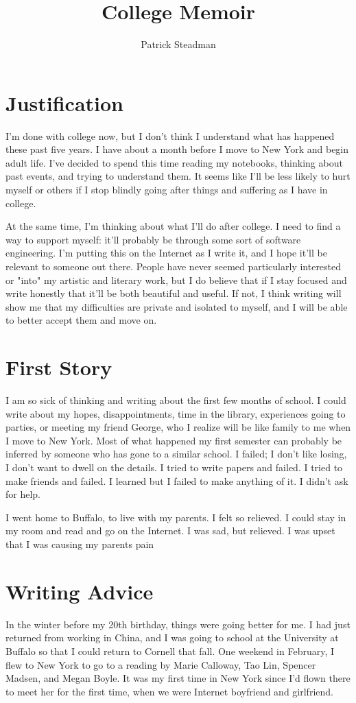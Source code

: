 \documentclass[12pt]{article}
\title{College Memoir}
\author{Patrick Steadman}
\begin{document}
\maketitle

\section{Justification}
I'm done with college now, but I don't think I understand what has happened
these past five years.  I have about a month before I move to New York and begin
adult life.  I've decided to spend this time reading my notebooks, thinking
about past events, and trying to understand them.  It seems like I'll be less
likely to hurt myself or others if I stop blindly going after things and
suffering as I have in college.

At the same time, I'm thinking about what I'll do after college.  I need to find
a way to support myself: it'll probably be through some sort of software
engineering.  I'm putting this on the Internet as I write it, and I hope it'll
be relevant to someone out there.  People have never seemed particularly
interested or "into" my artistic and literary work, but I do believe that if I
stay focused and write honestly that it'll be both beautiful and useful.  If
not, I think writing will show me that my difficulties are private and isolated
to myself, and I will be able to better accept them and move on.

\section{First Story}
I am so sick of thinking and writing about the first few months of school.  I
could write about my hopes, disappointments, time in the library, experiences
going to parties, or meeting my friend George, who I realize will be like family
to me when I move to New York.  Most of what happened my first semester can
probably be inferred by someone who has gone to a similar school.  I failed; I
don't like losing, I don't want to dwell on the details.  I tried to write
papers and failed.  I tried to make friends and failed.  I learned but I failed
to make anything of it.  I didn't ask for help.

I went home to Buffalo, to live with my parents.  I felt so relieved.  I could
stay in my room and read and go on the Internet.  I was sad, but relieved.  I
was upset that I was causing my parents pain


\section{Writing Advice}
In the winter before my 20th birthday, things were going better for me.  I had
just returned from working in China, and I was going to school at the University
at Buffalo so that I could return to Cornell that fall.  One weekend in
February, I flew to New York to go to a reading by Marie Calloway, Tao Lin,
Spencer Madsen, and Megan Boyle.  It was my first time in New York since I'd
flown there to meet her for the first time, when we were Internet boyfriend and
girlfriend.  
\end{document}

